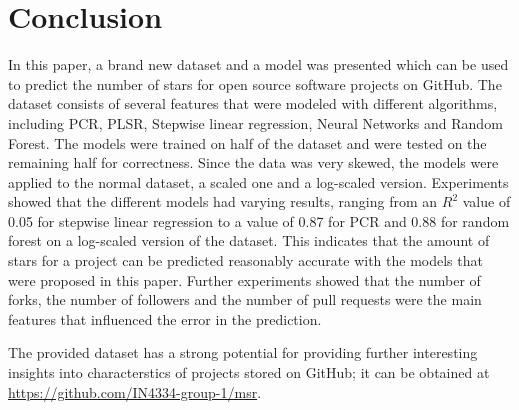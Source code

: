 \section{Conclusion}
	In this paper, a brand new dataset and a model was presented which can be used to predict the number of stars for open source software projects on GitHub.
	The dataset consists of several features that were modeled with different algorithms, including PCR, PLSR, Stepwise linear regression, Neural Networks and Random Forest.
	The models were trained on half of the dataset and were tested on the remaining half for correctness.
	Since the data was very skewed, the models were applied to the normal dataset, a scaled one and a log-scaled version.
	Experiments showed that the different models had varying results, ranging from an $R^2$ value of 0.05 for stepwise linear regression to a value of 0.87 for PCR and 0.88 for random forest on a log-scaled version of the dataset.
	This indicates that the amount of stars for a project can be predicted reasonably accurate with the models that were proposed in this paper.
	Further experiments showed that the number of forks, the number of followers and the number of pull requests were the main features that influenced the error in the prediction.
	
	The provided dataset has a strong potential for providing further interesting insights into characterstics of projects stored on GitHub; it can be obtained at \url{https://github.com/IN4334-group-1/msr}.
